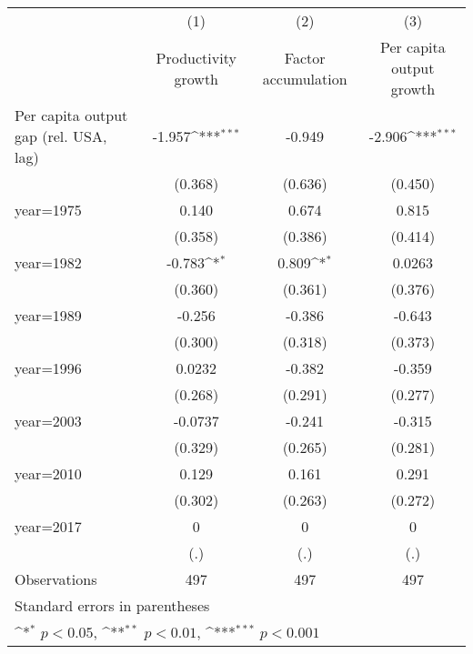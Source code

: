 {
\def\sym#1{\ifmmode^{#1}\else\(^{#1}\)\fi}
\begin{tabular}{l*{3}{c}}
\hline\hline
                    &\multicolumn{1}{c}{(1)}&\multicolumn{1}{c}{(2)}&\multicolumn{1}{c}{(3)}\\
                    &\multicolumn{1}{c}{Productivity growth}&\multicolumn{1}{c}{Factor accumulation}&\multicolumn{1}{c}{Per capita output growth}\\
\hline
Per capita output gap (rel. USA, lag)&      -1.957\sym{***}&      -0.949         &      -2.906\sym{***}\\
                    &     (0.368)         &     (0.636)         &     (0.450)         \\
[1em]
year=1975           &       0.140         &       0.674         &       0.815         \\
                    &     (0.358)         &     (0.386)         &     (0.414)         \\
[1em]
year=1982           &      -0.783\sym{*}  &       0.809\sym{*}  &      0.0263         \\
                    &     (0.360)         &     (0.361)         &     (0.376)         \\
[1em]
year=1989           &      -0.256         &      -0.386         &      -0.643         \\
                    &     (0.300)         &     (0.318)         &     (0.373)         \\
[1em]
year=1996           &      0.0232         &      -0.382         &      -0.359         \\
                    &     (0.268)         &     (0.291)         &     (0.277)         \\
[1em]
year=2003           &     -0.0737         &      -0.241         &      -0.315         \\
                    &     (0.329)         &     (0.265)         &     (0.281)         \\
[1em]
year=2010           &       0.129         &       0.161         &       0.291         \\
                    &     (0.302)         &     (0.263)         &     (0.272)         \\
[1em]
year=2017           &           0         &           0         &           0         \\
                    &         (.)         &         (.)         &         (.)         \\
\hline
Observations        &         497         &         497         &         497         \\
\hline\hline
\multicolumn{4}{l}{\footnotesize Standard errors in parentheses}\\
\multicolumn{4}{l}{\footnotesize \sym{*} \(p<0.05\), \sym{**} \(p<0.01\), \sym{***} \(p<0.001\)}\\
\end{tabular}
}

